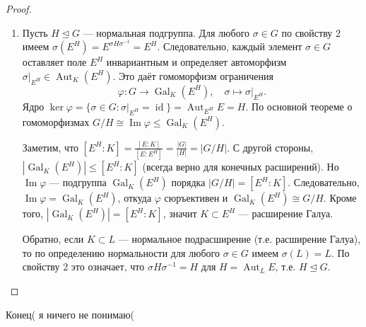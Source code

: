 \begin{proof}
\begin{enumerate}
        \item Пусть \(H \unlhd G\) --- нормальная подгруппа. Для любого \(\sigma \in G\) по свойству 2 имеем \(\sigma(E^H) = E^{\sigma H \sigma^{-1}} = E^H\). Следовательно, каждый элемент \(\sigma \in G\) оставляет поле \(E^H\) инвариантным и определяет автоморфизм \(\sigma|_{E^H} \in \operatorname{Aut}_K (E^H)\). Это даёт гомоморфизм ограничения
        \[
        \varphi: G \to \operatorname{Gal}_K(E^H), \quad \sigma \mapsto \sigma|_{E^H}.
        \]
        Ядро \(\ker \varphi = \{\sigma \in G : \sigma|_{E^H} = \operatorname{id}\} = \operatorname{Aut}_{E^H} E = H\). По основной теореме о гомоморфизмах \(G/H \cong \operatorname{Im} \varphi \le \operatorname{Gal}_K(E^H)\).

        Заметим, что \([E^H : K] = \frac{[E : K]}{[E : E^H]} = \frac{|G|}{|H|} = |G/H|\). С другой стороны, \(|\operatorname{Gal}_K(E^H)| \le [E^H : K]\) (всегда верно для конечных расширений). Но \(\operatorname{Im} \varphi\) --- подгруппа \(\operatorname{Gal}_K(E^H)\) порядка \(|G/H| = [E^H : K]\). Следовательно, \(\operatorname{Im} \varphi = \operatorname{Gal}_K(E^H)\), откуда \(\varphi\) сюръективен и \(\operatorname{Gal}_K(E^H) \cong G/H\). Кроме того, \(|\operatorname{Gal}_K(E^H)| = [E^H : K]\), значит \(K \subset E^H\) --- расширение Галуа.

        Обратно, если \(K \subset L\) --- нормальное подрасширение (т.е. расширение Галуа), то по определению нормальности для любого \(\sigma \in G\) имеем \(\sigma(L) = L\). По свойству 2 это означает, что \(\sigma H \sigma^{-1} = H\) для \(H = \operatorname{Aut}_L E\), т.е. \(H \unlhd G\).
    \end{enumerate}
\end{proof}

Конец( я ничего не понимаю(

